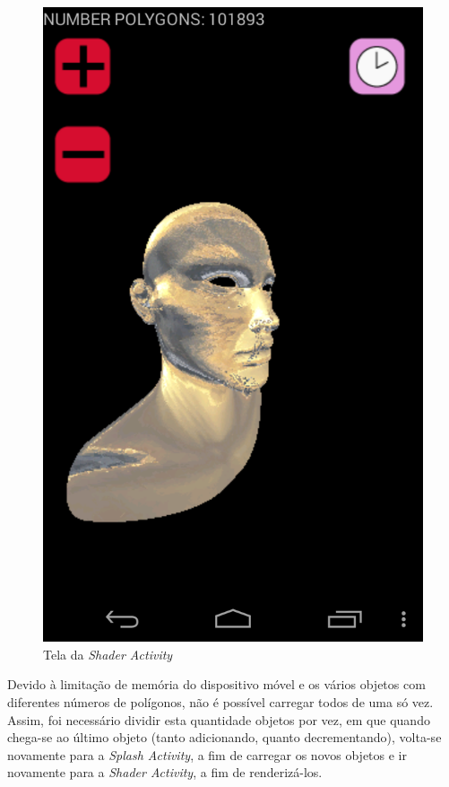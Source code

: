 	\begin{figure}[h]
	\centering
		\includegraphics[keepaspectratio=true,scale=0.2]{figuras/shader_act.png}
	\caption{Tela da \textit{Shader Activity}}
	\label{shader_act}
	\end{figure}

	Devido à limitação de memória do dispositivo móvel e os vários objetos com diferentes números de polígonos, não é possível carregar todos de uma só vez. Assim, foi necessário dividir esta quantidade objetos por vez, em que quando chega-se ao último objeto (tanto adicionando, quanto decrementando), volta-se novamente para a \textit{Splash Activity}, a fim de carregar os novos objetos e ir novamente para a \textit{Shader Activity}, a fim de renderizá-los.


